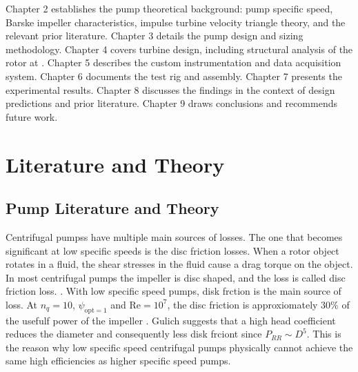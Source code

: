 Chapter 2 establishes the pump theoretical background: pump specific speed, Barske impeller characteristics, impulse turbine velocity triangle theory, and the relevant prior literature. Chapter 3 details the pump design and sizing methodology. Chapter 4 covers turbine design, including structural analysis of the rotor at \valPumpRpmDesign. Chapter 5 describes the custom instrumentation and data acquisition system. Chapter 6 documents the test rig and assembly. Chapter 7 presents the experimental results. Chapter 8 discusses the findings in the context of design predictions and prior literature. Chapter 9 draws conclusions and recommends future work.

\section{Literature and Theory}


\subsection{Pump Literature and Theory}


Centrifugal pumpss have multiple main sources of losses. The one that becomes significant at low specific speeds is the disc friction losses. When a rotor object rotates in a fluid, the shear stresses in the fluid cause a drag torque on the object. In most centrifugal pumps the impeller is disc shaped, and the loss is called disc friction loss. . With low specific speed pumps, disk frction is the main source of loss. At $n_q=10$, $\psi_{\textrm{opt}=1}$ and $\mathrm{Re}=10^7$, the disc friction is approxiomately $30\%$ of the usefulf power of the impeller \cite{gulichpage103}. Gulich suggests that a high head coefficient  reduces the diameter and consequently less disk frciont since $P_{RR}\sim D^5$. This is the reason why low specific speed centrifugal pumps physically cannot achieve the same high efficiencies as higher specific speed pumps. 

